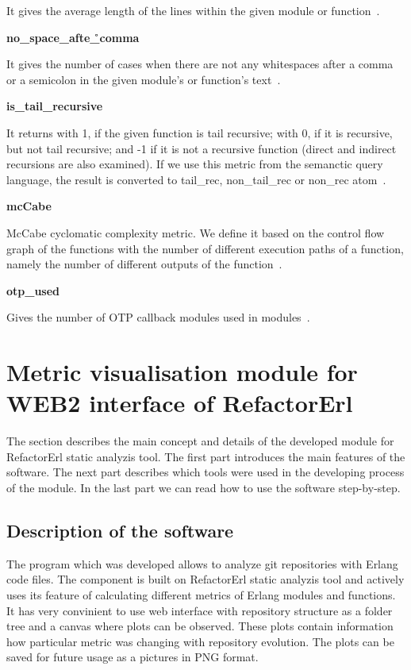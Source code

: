 It gives the average length of the lines within the given module or function~\cite{refactorerlm}.

\textbf{no\_space\_afte\r\_comma}

It gives the number of cases when there are not any whitespaces after a comma or a semicolon in the given module's or function's text~\cite{refactorerlm}.

\textbf{is\_tail\_recursive}

It returns with 1, if the given function is tail recursive; with 0, if it is recursive, but not tail recursive; and -1 if it is not a recursive function (direct and indirect recursions are also examined). If we use this metric from the semanctic query language, the result is converted to tail\_rec, non\_tail\_rec or non\_rec atom~\cite{refactorerlm}.

\textbf{mcCabe}

McCabe cyclomatic complexity metric. We define it based on the control flow graph of the functions with the number of different execution paths of a function, namely the number of different outputs of the function~\cite{refactorerlm}.

\textbf{otp\_used}

Gives the number of OTP callback modules used in modules~\cite{refactorerlm}.

\section{Metric visualisation module for WEB2 interface of RefactorErl}

The section describes the main concept and details of the developed module for RefactorErl static analyzis tool. The first part introduces the main features of the software. The next part describes which tools were used in the developing process of the module. In the last part we can read how to use the software step-by-step.

\subsection{Description of the software}

The program which was developed allows to analyze git repositories with Erlang code files. The component is built on RefactorErl static analyzis tool and actively uses its feature of calculating different metrics of Erlang modules and functions. It has very convinient to use web interface with repository structure as a folder tree and a canvas where plots can be observed. These plots contain information how particular metric was changing with repository evolution. The plots can be saved for future usage as a pictures in PNG format.

